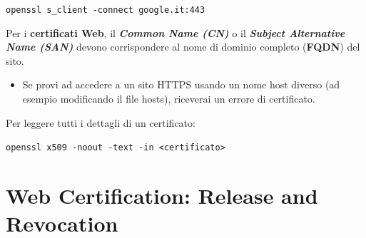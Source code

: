 \begin{flushleft}
    {\centering
        \texttt{openssl s\_client -connect google.it:443}
    \par}

    Per i \textbf{certificati Web}, il \textbf{\textit{Common Name (CN)}} o il \textbf{\textit{Subject Alternative Name (SAN)}} devono corrispondere al nome di dominio completo (\textbf{FQDN}) del sito.
    \begin{itemize}[nosep]
        \item Se provi ad accedere a un sito HTTPS usando un nome host diverso (ad esempio modificando il file hosts), riceverai un errore di certificato.
    \end{itemize}
    
    Per leggere tutti i dettagli di un certificato:

    {\centering
        \texttt{openssl x509 -noout -text -in <certificato>}
    \par}

\end{flushleft}

\section{Web Certification: Release and Revocation}

